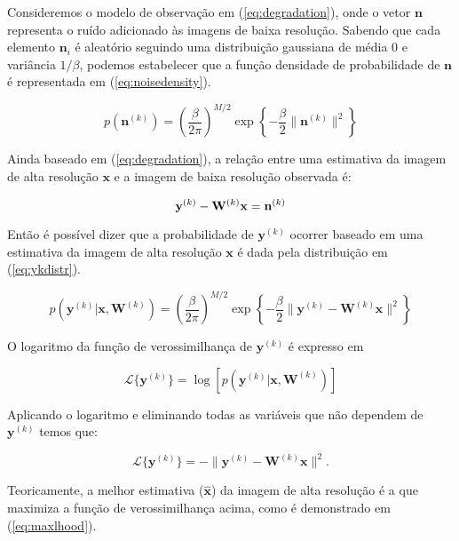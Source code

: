 Consideremos o modelo de observação em (\ref{eq:degradation}), onde o vetor
$\mathbf{n}$ representa o ruído adicionado às imagens de baixa resolução.
Sabendo que cada elemento $\mathbf{n}_i$ é aleatório seguindo uma distribuição
gaussiana de média 0 e variância $1/\beta$, podemos estabelecer que a função
densidade de probabilidade de $\mathbf{n}$ é representada em (\ref{eq:noisedensity}).

\begin{equation}
	\label{eq:noisedensity}
	p(\mathbf{n}^{(k)}) = \left(\frac{ \beta}{2\pi} \right)^{M/2}
	\exp{\left\{  -  \frac{\beta}{2}\|\mathbf{n}^{(k)}\|^2 \right\}}
\end{equation}

Ainda baseado em (\ref{eq:degradation}), a relação entre uma estimativa da imagem de alta resolução $\mathbf{x}$ e a imagem de baixa resolução observada é:

\begin{equation}
	\mathbf{y}^{(k)} - \mathbf{W}^{(k)} \mathbf{x} =  \mathbf{n}^{(k)} \\
\end{equation}

Então é possível dizer que a probabilidade de $\mathbf{y}^{(k)}$ ocorrer baseado em uma estimativa da imagem de alta resolução $\mathbf{x}$ é dada pela distribuição em (\ref{eq:ykdistr}).

\begin{equation}
	\label{eq:ykdistr}
	p(\mathbf{y}^{(k)} | \mathbf{x}, \mathbf{W}^{(k)}) = \left(\frac{ \beta}{2\pi} \right)^{M/2}
	\exp{\left\{-\frac{\beta}{2}\|\mathbf{y}^{(k)} - \mathbf{W}^{(k)}\mathbf{x} \|^2 \right\}}
\end{equation}

O logaritmo da função de verossimilhança de $\mathbf{y}^{(k)}$ é expresso em

\begin{equation}
	\mathcal{L}\{\mathbf{y}^{(k)}\} = \log \left[ p(\mathbf{y}^{(k)} | \mathbf{x}, \mathbf{W}^{(k)}) \right]
\end{equation}

Aplicando o logaritmo e eliminando todas as variáveis que não dependem de $\mathbf{y}^{(k)}$ temos que:

\begin{equation}
	\mathcal{L}\{\mathbf{y}^{(k)}\} = -\|\mathbf{y}^{(k)} - \mathbf{W}^{(k)}\mathbf{x}\|^2.
\end{equation}

Teoricamente, a melhor estimativa ($\hat{\mathbf{x}}$) da imagem de alta resolução é a
que maximiza a função de verossimilhança acima, como é demonstrado em (\ref{eq:maxlhood}).


